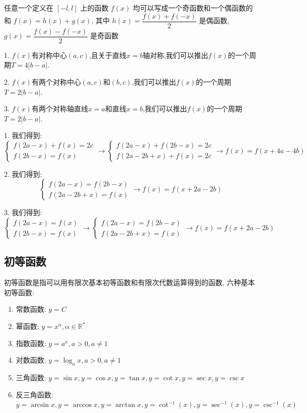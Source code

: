 \begin{corollary}[奇偶性推论]
	任意一个定义在 $[-l,l]$ 上的函数 $f(x)$ 均可以写成一个奇函数和一个偶函数的和 $f(x)=h(x)+g(x)$, 其中 $h(x)=\dfrac{f(x)+f(-x)}{2}$ 是偶函数, $g(x)=\dfrac{f(x)-f(-x)}{2}$ 是奇函数
\end{corollary}

\begin{corollary}
	
	1. $f(x)$有对称中心$(a,c)$,且关于直线$x=b$轴对称,我们可以推出$f(x)$的一个周期$T=4|b-a|$.
	
	2. $f(x)$有两个对称中心$(a,c)$和$(b,c)$,我们可以推出$f(x)$的一个周期$T=2|b-a|$.
	
	3. $f(x)$有两个对称轴直线$x=a$和直线$x=b$,我们可以推出$f(x)$的一个周期$T=2|b-a|$.

\end{corollary}
\begin{anymark}[证明]
	1. 我们得到: 
	$$\begin{cases} f(2a-x)+f(x)=2c  \\ f(2b-x) = f(x)\end{cases}\to \begin{cases} f(2a-x) + f(2b-x) =2c\\ f(2a-2b+x) +f(x) =2c  \end{cases}\to f(x) = f(x+4a-4b)$$

	2. 我们得到:
	$$\begin{cases} f(2a-x) = f(2b-x)  \\ f(2a-2b+x) = f(x) \end{cases}\to f(x) = f(x+2a-2b)$$

	3. 我们得到:
	$$\begin{cases} f(2a-x) = f(x)  \\ f(2b-x) = f(x)\end{cases}\to \begin{cases} f(2a-x) = f(2b-x) \\ f(2a-2b+x) = f(x)   \end{cases}\to f(x) = f(x+2a-2b)$$
\end{anymark}

\subsection{初等函数}
\begin{definition}[初等函数]
	初等函数是指可以用有限次基本初等函数和有限次代数运算得到的函数, 六种基本初等函数:
	\begin{enumerate}
		\item 常数函数: $y=C$
		\item 幂函数: $y=x^{\alpha},\alpha\in \mathbb{R}^{*}$
		\item 指数函数: $y=a^{x},a>0,a\neq 1$
		\item 对数函数: $y=\log_{a}x,a>0,a\neq 1$
		\item 三角函数: $y=\sin x, y=\cos x, y=\tan x, y=\cot x, y=\sec x, y=\csc x$
		\item 反三角函数: $y=\arcsin x, y=\arccos x, y=\arctan x, y=\cot^{-1}(x), y=\sec^{-1}(x), y=\csc^{-1}(x)$
	\end{enumerate}
\end{definition}

